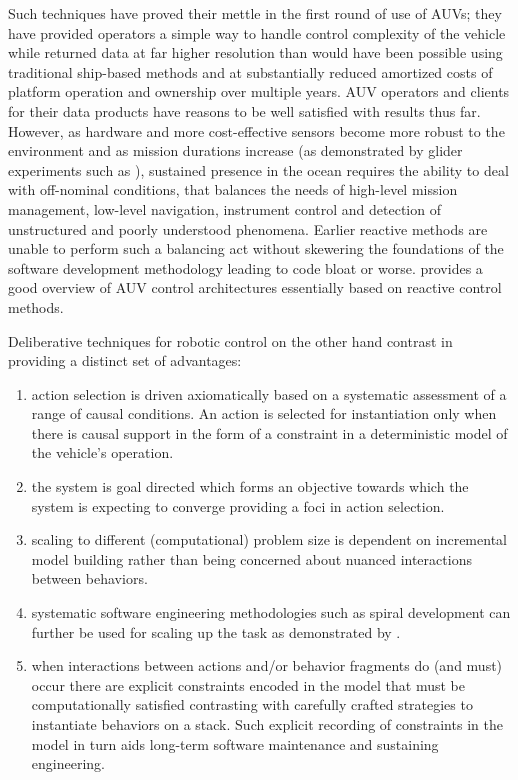 Such techniques have proved their mettle in the first round of use of
AUVs; they have provided operators a simple way to handle control
complexity of the vehicle while returned data at far higher resolution
than would have been possible using traditional ship-based methods and
at substantially reduced amortized costs of platform operation and
ownership over multiple years. AUV operators and clients for their
data products have reasons to be well satisfied with results thus
far. However, as hardware and more cost-effective sensors become more
robust to the environment and as mission durations increase (as
demonstrated by glider experiments such as \cite{rucool11}), sustained
presence in the ocean requires the ability to deal with off-nominal
conditions, that balances the needs of high-level mission management,
low-level navigation, instrument control and detection of unstructured
and poorly understood phenomena. Earlier reactive methods are unable
to perform such a balancing act without skewering the foundations of
the software development methodology leading to code bloat or worse.
\cite{carreras06} provides a good overview of AUV control
architectures essentially based on reactive control methods.

Deliberative techniques for robotic control on the other hand
contrast in providing a distinct set of advantages:

\begin{enumerate}

\item action selection is driven axiomatically based on a systematic
  assessment of a range of causal conditions. An action is selected
  for instantiation only when there is causal support in the form of a
  constraint in a deterministic model of the vehicle's operation.

\item the system is goal directed which forms an objective towards
  which the system is expecting to converge providing a foci in action
  selection.

\item scaling to different (computational) problem size is dependent
  on incremental model building rather than being concerned about
  nuanced interactions between behaviors.

\item systematic software engineering methodologies such as spiral
  development \cite{boehm86} can further be used for scaling up the
  task as demonstrated by \cite{DS1report}.

\item when interactions between actions and/or behavior fragments do
  (and must) occur there are explicit constraints encoded in the model
  that must be computationally satisfied contrasting with carefully
  crafted strategies to instantiate behaviors on a stack. Such
  explicit recording of constraints in the model in turn aids
  long-term software maintenance and sustaining engineering.

\end{enumerate}

